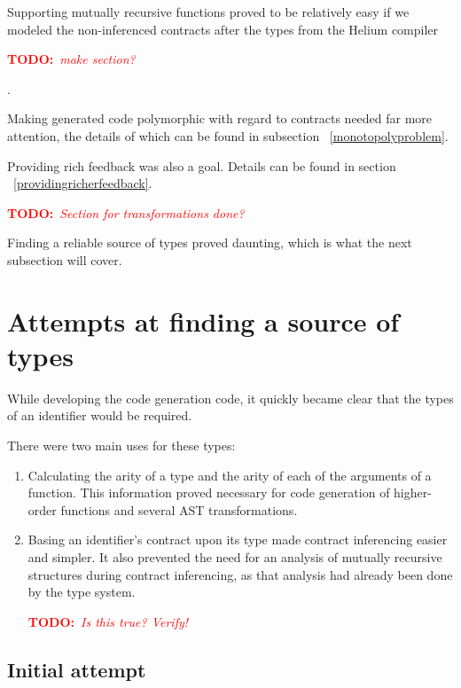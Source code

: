 \documentclass[10pt]{report}
\newcommand{\annotate}[3]{
	\begin{scriptsize}
	\textcolor{#1}{\textbf{#2}~\textit{#3}}
	\end{scriptsize}\newline}
\newcommand{\todo}[1]{\annotate{red} {TODO:} {#1}}
\begin{document}
Supporting mutually recursive functions proved to be relatively easy if we modeled the non-inferenced contracts after the types from the Helium compiler \todo{make section?}.

Making generated code polymorphic with regard to contracts needed far more attention, the details of which can be found in subsection ~\ref{monotopolyproblem}.

Providing rich feedback was also a goal. Details can be found in section ~\ref{providingricherfeedback}.

\todo{Section for transformations done?}

Finding a reliable source of types proved daunting, which is what the next subsection will cover.

\section{Attempts at finding a source of types}
\label{attemptssourceoftypes}
While developing the code generation code, it quickly became clear that the types of an identifier would be required.

There were two main uses for these types:
\begin{enumerate}
\item Calculating the arity of a type and the arity of each of the arguments of a function. This information proved necessary for code generation of higher-order functions and several AST transformations.
\item Basing an identifier's contract upon its type made contract inferencing easier and simpler. It also prevented the need for an analysis of mutually recursive structures during contract inferencing, as that analysis had already been done by the type system. \todo{Is this true? Verify!}
\end{enumerate}

\subsection{Initial attempt}
\end{document}
